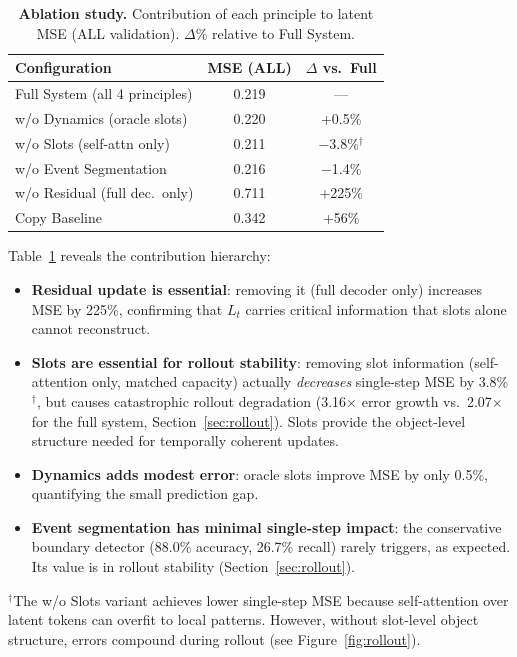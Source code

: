\documentclass{article}
\begin{document}
\begin{table}[t]
\centering
\caption{%
  \textbf{Ablation study.} Contribution of each principle to latent MSE
  (ALL validation). $\Delta$\% relative to Full System.
}
\label{tab:ablation}
\begin{tabular}{@{}lcc@{}}
\toprule
Configuration & MSE (ALL) & $\Delta$ vs.\ Full \\
\midrule
Full System (all 4 principles)  & 0.219 & --- \\
\quad w/o Dynamics (oracle slots) & 0.220 & +0.5\% \\
\quad w/o Slots (self-attn only)  & 0.211 & $-$3.8\%$^\dagger$ \\
\quad w/o Event Segmentation      & 0.216 & $-$1.4\% \\
\quad w/o Residual (full dec.\ only)      & 0.711 & +225\% \\
Copy Baseline                     & 0.342 & +56\% \\
\bottomrule
\end{tabular}
\end{table}

Table~\ref{tab:ablation} reveals the contribution hierarchy:
\begin{itemize}
\item \textbf{Residual update is essential}: removing it (full decoder only)
  increases MSE by 225\%, confirming that $L_t$ carries critical
  information that slots alone cannot reconstruct.
\item \textbf{Slots are essential for rollout stability}: removing slot
  information (self-attention only, matched capacity) actually
  \emph{decreases} single-step MSE by 3.8\%$^\dagger$, but causes
  catastrophic rollout degradation (3.16$\times$ error growth vs.\
  2.07$\times$ for the full system, Section~\ref{sec:rollout}). Slots provide the
  object-level structure needed for temporally coherent updates.
\item \textbf{Dynamics adds modest error}: oracle slots improve MSE by
  only 0.5\%, quantifying the small prediction gap.
\item \textbf{Event segmentation has minimal single-step impact}: the
  conservative boundary detector (88.0\% accuracy, 26.7\% recall) rarely
  triggers, as expected.
  Its value is in rollout stability (Section~\ref{sec:rollout}).
\end{itemize}
\smallskip
\noindent $^\dagger$The w/o Slots variant achieves lower single-step MSE
because self-attention over latent tokens can overfit to local patterns.
However, without slot-level object structure, errors compound during
rollout (see Figure~\ref{fig:rollout}).
\end{document}
